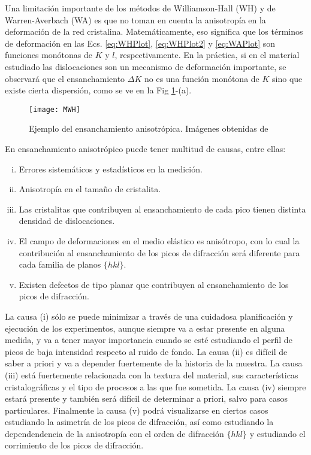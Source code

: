 Una limitación importante de los métodos de Williamson-Hall (WH) y de Warren-Averbach (WA) es que no toman en cuenta la anisotropía en la deformación de la red cristalina. 
Matemáticamente, eso significa que los términos de deformación en las Ecs. \ref{eq:WHPlot}, \ref{eq:WHPlot2} y \ref{eq:WAPlot} son funciones monótonas de $K$ y $l$, respectivamente.
En la práctica, si en el material estudiado las dislocaciones son un mecanismo de deformación importante, se observará que el ensanchamiento $\Delta K$ no es una función monótona de $K$ sino que existe cierta dispersión, como se ve en la Fig \ref{fig:MWH}-(a). 

\begin{figure}[!htb]
  \centering
  \texttt{[image: MWH]}
  \caption{Ejemplo del ensanchamiento anisotrópica. Imágenes obtenidas de \cite{Ungar1999}}
  \label{fig:MWH}
\end{figure}

En ensanchamiento anisotrópico puede tener multitud de causas, entre ellas:
\begin{enumerate}[(i)]
  \item Errores sistemáticos y estadísticos en la medición. 
  \item Anisotropía en el tamaño de cristalita.
  \item Las cristalitas que contribuyen al ensanchamiento de cada pico tienen distinta densidad de dislocaciones.
  \item El campo de deformaciones en el medio elástico es anisótropo, con lo cual la contribución al ensanchamiento de los picos de difracción será diferente para cada familia de planos $\{hkl\}$.
  \item Existen defectos de tipo planar que contribuyen al ensanchamiento de los picos de difracción.
\end{enumerate}

La causa (i) sólo se puede minimizar a través de una cuidadosa planificación y ejecución de los experimentos, aunque siempre va a estar presente en alguna medida, y va a tener mayor importancia cuando se esté estudiando el perfil de picos de baja intensidad respecto al ruido de fondo. 
La causa (ii) es difícil de saber a priori y va a depender fuertemente de la historia de la muestra. 
La causa (iii) está fuertemente relacionada con la textura del material, sus características cristalográficas y el tipo de procesos a las que fue sometida. 
La causa (iv) siempre estará presente y también será difícil de determinar a priori, salvo para casos particulares.
Finalmente la causa (v) podrá visualizarse en ciertos casos estudiando la asimetría de los picos de difracción, así como estudiando la dependendencia de la anisotropía con el orden de difracción $\{hkl\}$ y estudiando el corrimiento de los picos de difracción.


